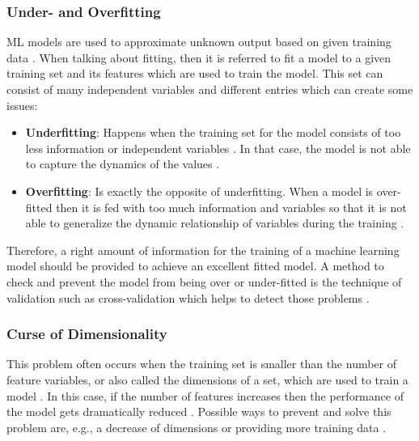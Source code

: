 \documentclass[MGS,Master,english]{twbook}%
\begin{document}
\subsubsection{Under- and Overfitting}
ML models are used to approximate unknown output based on given training data \cite{ml::book::algorithms}. When talking about fitting, then it is referred to fit a model to a given training set and its features which are used to train the model. This set can consist of many independent variables and different entries which can create some issues:
\begin{itemize}
	\item \textbf{Underfitting}: Happens when the training set for the model consists of too less information or independent variables \cite{ml::book::algorithms}. In that case, the model is not able to capture the dynamics of the values \cite{ml::book::algorithms}.
	\item \textbf{Overfitting}: Is exactly the opposite of underfitting. When a model is over-fitted then it is fed with too much information and variables so that it is not able to generalize the dynamic relationship of variables during the training \cite{ml::book::algorithms}.
\end{itemize}

Therefore, a right amount of information for the training of a machine learning model should be provided to achieve an excellent fitted model. A method to check and prevent the model from being over or under-fitted is the technique of validation such as cross-validation which helps to detect those problems \cite{ml::book::algorithms}.

\subsubsection{Curse of Dimensionality}
This problem often occurs when the training set is smaller than the number of feature variables, or also called the dimensions of a set, which are used to train a model \cite{ml::book::algorithms}. In this case, if the number of features increases then the performance of the model gets dramatically reduced \cite{ml::book::algorithms}. Possible ways to prevent and solve this problem are, e.g., a decrease of dimensions or providing more training data \cite{ml::book::algorithms}.
\end{document}

